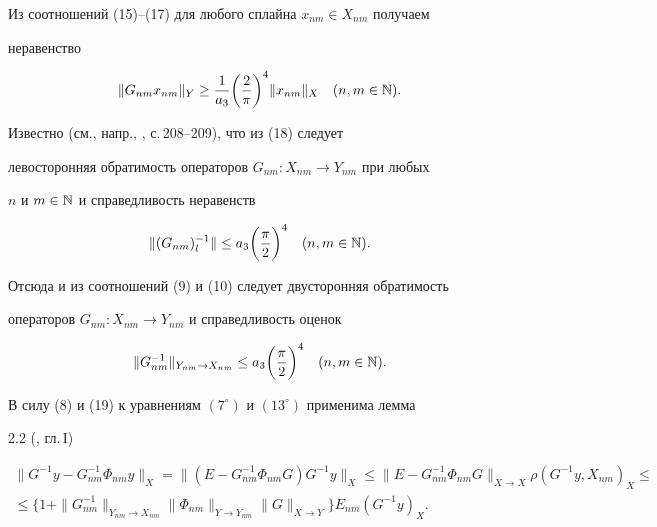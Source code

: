 \begin{pf}
Из соотношений (15)--(17) для любого сплайна $x_{nm}\in X_{nm}$ получаем 


неравенство 


\begin{equation} 


\|G_{nm}x_{nm}\|_Y\ge\frac{1}{a_3}\bigg(\frac{2}{\pi} \bigg)^4 


\|x_{nm}\|_X\quad (n,m\in\Bbb N). 


\end{equation} 


Известно (см., напр., \cite{6}, с.\,208--209), что из (18) следует 


левосторонняя обратимость операторов $G_{nm}: X_{nm}\to Y_{nm}$ при любых 


$n$ и $m\in\Bbb N$ и справедливость неравенств 


$$ 


\|(G_{nm})^{-1}_l\|\le a_3\bigg(\frac{\pi}{2} \bigg)^4\quad 


(n,m\in \Bbb N). 


$$ 


Отсюда и из соотношений (9) и (10) следует двусторонняя обратимость 


операторов $G_{nm}:X_{nm}\to Y_{nm}$ и справедливость оценок 


\begin{equation} 


\|G^{-1}_{nm}\|_{Y_{nm}\to X_{nm}}\le a_3 


\bigg(\frac{\pi}{2} \bigg)^4\quad (n,m\in\Bbb N). 


\end{equation} 


В силу (8) и (19) к уравнениям $(7^\circ)$ и $(13^\circ)$ применима лемма 


2.2 (\cite{4}, гл.\,I) 


\begin{gather*} 


\|G^{-1}y-G^{-1}_{nm}\Phi_{nm}y\|_X= 


\|(E-G^{-1}_{nm}\Phi_{nm}G)G^{-1}y\|_X\le 


\|E-G^{-1}_{nm}\Phi_{nm}G\|_{X\to X}\rho(G^{-1}y,X_{nm})_X\le \\ 


% 


\le\{1+\|G^{-1}_{nm}\|_{Y_{nm}\to X_{nm}} 


\|\Phi_{nm}\|_{Y\to Y_{nm}}\|G\|_{X\to Y}\} 


E_{nm}(G^{-1}y)_X. 


\end{gather*} 



\end{pf}

